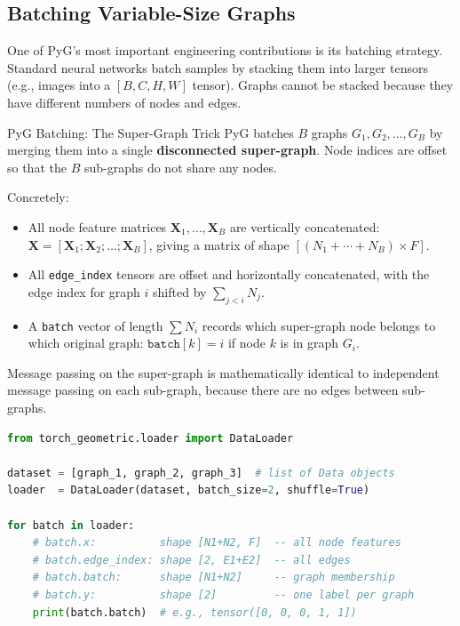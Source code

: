\subsection{Batching Variable-Size Graphs}

One of PyG's most important engineering contributions is its batching strategy. Standard neural networks batch samples by stacking them into larger tensors (e.g., images into a $[B, C, H, W]$ tensor). Graphs cannot be stacked because they have different numbers of nodes and edges.

\begin{conceptbox}{PyG Batching: The Super-Graph Trick}
PyG batches $B$ graphs $G_1, G_2, \ldots, G_B$ by merging them into a single \textbf{disconnected super-graph}. Node indices are offset so that the $B$ sub-graphs do not share any nodes.

Concretely:
\begin{itemize}[noitemsep]
    \item All node feature matrices $\mathbf{X}_1, \ldots, \mathbf{X}_B$ are vertically concatenated: $\mathbf{X} = [\mathbf{X}_1; \mathbf{X}_2; \ldots; \mathbf{X}_B]$, giving a matrix of shape $[(N_1 + \cdots + N_B) \times F]$.
    \item All \texttt{edge\_index} tensors are offset and horizontally concatenated, with the edge index for graph $i$ shifted by $\sum_{j<i} N_j$.
    \item A \texttt{batch} vector of length $\sum N_i$ records which super-graph node belongs to which original graph: $\texttt{batch}[k] = i$ if node $k$ is in graph $G_i$.
\end{itemize}
Message passing on the super-graph is mathematically identical to independent message passing on each sub-graph, because there are no edges between sub-graphs.

\begin{lstlisting}[language=Python]
from torch_geometric.loader import DataLoader

dataset = [graph_1, graph_2, graph_3]  # list of Data objects
loader  = DataLoader(dataset, batch_size=2, shuffle=True)

for batch in loader:
    # batch.x:          shape [N1+N2, F]  -- all node features
    # batch.edge_index: shape [2, E1+E2]  -- all edges
    # batch.batch:      shape [N1+N2]     -- graph membership
    # batch.y:          shape [2]         -- one label per graph
    print(batch.batch)  # e.g., tensor([0, 0, 0, 1, 1])
\end{lstlisting}
\end{conceptbox}

